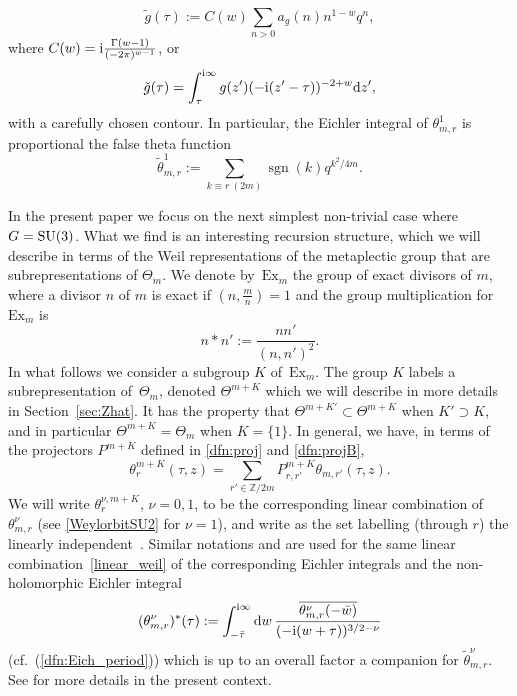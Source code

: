 \documentclass[pdftex]{sigma}
\def\ri{\mathrm{i}}
\def\BZ{\mathbb{Z}}
\newcommand{\ZZ}{\mathbb{Z}}
\theoremstyle{definition}
\numberwithin{equation}{section}
\begin{document}
\begin{equation}\label{dfn:Eichler_integral}
 \tilde g(\tau) := C(w)\sum_{n>0}a_g(n)n^{1-w} q^n,
\end{equation}
where $C(w)={\rm i}\frac{\Gamma(w-1)}{(-2\pi)^{w-1}}$, or
\[
 \tilde g(\tau) = \int_{\tau}^{{\rm i}\infty} g(z')(-{\rm i}(z'-\tau))^{-2+w} {\rm d}z',
\]
with a carefully chosen contour. In particular, the Eichler integral of $\theta^1_{m,r}$ is proportional the false theta function
\[
 \tilde\theta^1_{m,r}:= \sum_{k\equiv r~(2m)}
 \operatorname{sgn}(k)q^{k^2/4m}.
\]


In the present paper we focus on the next simplest non-trivial case where $G={\rm SU}(3)$. What we find is an interesting recursion structure, which we will describe in terms of the Weil representations of the metaplectic group \smash{$\widetilde{{\rm SL}_2(\BZ)}$} that are subrepresentations of $\Theta_m$. We denote by~$\mathrm{Ex}_m$ the group of exact divisors of $m$, where a divisor $n$ of $m$ is exact if $\left(n,\frac{m}{n}\right)=1$ and the group multiplication for $\mathrm{Ex}_m$ is
\[n\ast n':=\frac{nn'}{(n,n')^2}.\] In what follows we consider a subgroup $K$ of~$\mathrm{Ex}_m$. The group $K$ labels a subrepresentation of~$\Theta_m$, denoted $\Theta^{m+K}$ which we will describe in more details in Section~\ref{sec:Zhat}. It has the property that $\Theta^{m+K'}\subset \Theta^{m+K} $ when $K'\supset K$, and in particular $\Theta^{m+K}=\Theta_m$ when $K=\{1\}$. In general, we have, in terms of the projectors $P^{m+K}$ defined in \eqref{dfn:proj} and \eqref{dfn:projB},
\begin{equation}\label{linear_weil}
 \theta^{m+K}_{r}(\tau,z) = \sum_{r'\in \ZZ/2m} P_{r,r'}^{m+K} \theta_{m,r'}(\tau,z).
\end{equation}
We will write $\theta^{\nu,m+K}_{r}$, $\nu=0,1$, to be the corresponding linear combination of $\theta^{\nu}_{m,r}$ (see \eqref{WeylorbitSU2} for $\nu=1$), and write \smash{$\sigma^{m+K}\subset \ZZ/2m$} as the set labelling (through $r$) the linearly independent~. Similar notations  and  are used for the same linear combination~\eqref{linear_weil} of the corresponding Eichler integrals and the non-holomorphic Eichler integral
 \[
 ({\theta^\nu_{m,r}})^\ast(\tau) :=
 \int_{-\bar{\tau} }^{{\rm i}\infty} {\rm d}w \,
\frac{\overline{\theta^\nu_{m,r}(-\bar w)}}{(-\ri(w+\tau))^{3/2-\nu}}
 \]
 (cf.\ (\ref{dfn:Eich_period})) which is up to an overall factor a companion for $ \tilde\theta^\nu_{m,r}$. See \cite[Section~7.3]{cheng20193d} for more details in the present context.
\end{document}
